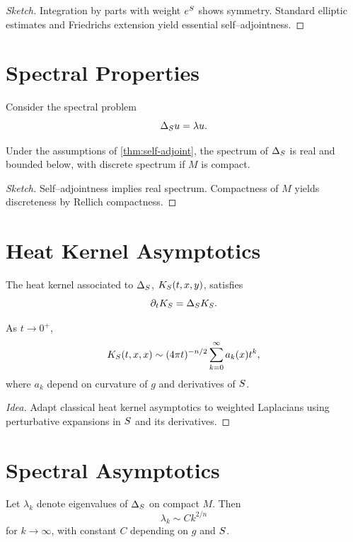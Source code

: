 \begin{proof}[Sketch]
Integration by parts with weight $e^{S}$ shows symmetry. Standard
elliptic estimates and Friedrichs extension yield essential
self--adjointness.
\end{proof}


\section{Spectral Properties}

Consider the spectral problem
\[
  \Delta_{S} u = \lambda u.
\]

\begin{proposition}
Under the assumptions of \cref{thm:self-adjoint}, the spectrum of
$\Delta_{S}$ is real and bounded below, with discrete spectrum if
$M$ is compact.
\end{proposition}

\begin{proof}[Sketch]
Self--adjointness implies real spectrum. Compactness of $M$ yields
discreteness by Rellich compactness.
\end{proof}


\section{Heat Kernel Asymptotics}

The heat kernel associated to $\Delta_{S}$,
$K_{S}(t,x,y)$, satisfies
\[
  \partial_t K_{S} = \Delta_{S}K_{S}.
\]

\begin{theorem}
As $t\to 0^+$,
\[
  K_{S}(t,x,x) \sim (4\pi t)^{-n/2}\sum_{k=0}^\infty a_k(x)t^k,
\]
where $a_k$ depend on curvature of $g$ and derivatives of $S$.
\end{theorem}

\begin{proof}[Idea]
Adapt classical heat kernel asymptotics to weighted Laplacians using
perturbative expansions in $S$ and its derivatives.
\end{proof}


\section{Spectral Asymptotics}

\begin{proposition}
Let $\lambda_k$ denote eigenvalues of $\Delta_{S}$ on compact $M$.
Then
\[
  \lambda_k \sim C k^{2/n}
\]
for $k\to\infty$, with constant $C$ depending on $g$ and $S$.
\end{proposition}

